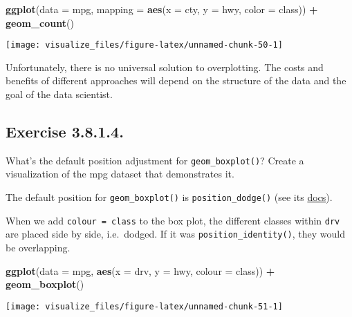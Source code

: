 \documentclass[]{book}
\newenvironment{Shaded}{\begin{snugshade}}{\end{snugshade}}
\newcommand{\DataTypeTok}[1]{\textcolor[rgb]{0.13,0.29,0.53}{#1}}
\newcommand{\KeywordTok}[1]{\textcolor[rgb]{0.13,0.29,0.53}{\textbf{#1}}}
\newcommand{\NormalTok}[1]{#1}
\newcommand{\OperatorTok}[1]{\textcolor[rgb]{0.81,0.36,0.00}{\textbf{#1}}}
\newcommand{\StringTok}[1]{\textcolor[rgb]{0.31,0.60,0.02}{#1}}
\theoremstyle{plain}
\theoremstyle{remark}
\begin{document}
\begin{Shaded}
\begin{Highlighting}[]
\KeywordTok{ggplot}\NormalTok{(}\DataTypeTok{data =}\NormalTok{ mpg, }\DataTypeTok{mapping =} \KeywordTok{aes}\NormalTok{(}\DataTypeTok{x =}\NormalTok{ cty, }\DataTypeTok{y =}\NormalTok{ hwy, }\DataTypeTok{color =}\NormalTok{ class)) }\OperatorTok{+}
\StringTok{  }\KeywordTok{geom_count}\NormalTok{()}
\end{Highlighting}
\end{Shaded}

\begin{center}\texttt{[image: visualize\_files/figure-latex/unnamed-chunk-50-1]} \end{center}

Unfortunately, there is no universal solution to overplotting. The costs
and benefits of different approaches will depend on the structure of the
data and the goal of the data scientist.

\hypertarget{exercise-3.8.1.4.}{%
\subsection*{\texorpdfstring{Exercise
{3.8.1.4}.}{Exercise 3.8.1.4.}}\label{exercise-3.8.1.4.}}

What's the default position adjustment for \texttt{geom\_boxplot()}?
Create a visualization of the mpg dataset that demonstrates it.

The default position for \texttt{geom\_boxplot()} is
\texttt{position\_dodge()} (see its
\href{https://ggplot2.tidyverse.org/reference/geom_boxplot.html}{docs}).

When we add \texttt{colour\ =\ class} to the box plot, the different
classes within \texttt{drv} are placed side by side, i.e.~dodged. If it
was \texttt{position\_identity()}, they would be overlapping.

\begin{Shaded}
\begin{Highlighting}[]
\KeywordTok{ggplot}\NormalTok{(}\DataTypeTok{data =}\NormalTok{ mpg, }\KeywordTok{aes}\NormalTok{(}\DataTypeTok{x =}\NormalTok{ drv, }\DataTypeTok{y =}\NormalTok{ hwy, }\DataTypeTok{colour =}\NormalTok{ class)) }\OperatorTok{+}
\StringTok{  }\KeywordTok{geom_boxplot}\NormalTok{()}
\end{Highlighting}
\end{Shaded}

\begin{center}\texttt{[image: visualize\_files/figure-latex/unnamed-chunk-51-1]} \end{center}
\end{document}
